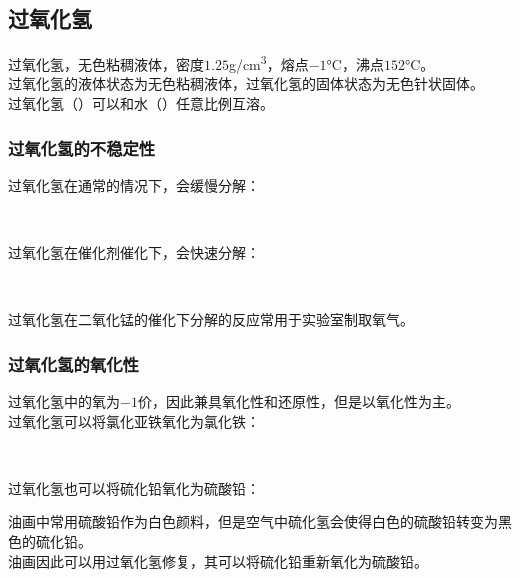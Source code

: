 \documentclass[UTF8]{ctexart}
\begin{document}
\subsection{过氧化氢}
    过氧化氢，无色粘稠液体，密度$1.25$\si{g/cm^3}，熔点$-1$\si{\degreeCelsius}，沸点$152$\si{\degreeCelsius}。\\[3mm]
    过氧化氢的液体状态为无色粘稠液体，过氧化氢的固体状态为无色针状固体。\\[3mm]
    过氧化氢（）可以和水（）任意比例互溶。

\subsubsection{过氧化氢的不稳定性}
    过氧化氢在通常的情况下，会缓慢分解：
    \begin{center}
        \\[4mm]
    \end{center}
    过氧化氢在催化剂催化下，会快速分解：
    \begin{center}
        \\[4mm]
    \end{center}
    过氧化氢在二氧化锰的催化下分解的反应常用于实验室制取氧气。

\subsubsection{过氧化氢的氧化性}
    过氧化氢中的氧为$-1$价，因此兼具氧化性和还原性，但是以氧化性为主。\\[3mm]
    过氧化氢可以将氯化亚铁氧化为氯化铁：
    \begin{center}
        \\[4mm]
    \end{center}
    过氧化氢也可以将硫化铅氧化为硫酸铅：
    \begin{center}
    \end{center}
    油画中常用硫酸铅作为白色颜料，但是空气中硫化氢会使得白色的硫酸铅转变为黑色的硫化铅。\\[3mm]
    油画因此可以用过氧化氢修复，其可以将硫化铅重新氧化为硫酸铅。

\newpage
\end{document}
